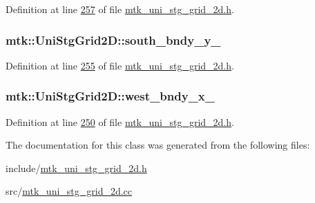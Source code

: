 Definition at line \hyperlink{mtk__uni__stg__grid__2d_8h_source_l00257}{257} of file \hyperlink{mtk__uni__stg__grid__2d_8h_source}{mtk\-\_\-uni\-\_\-stg\-\_\-grid\-\_\-2d.\-h}.

\hypertarget{classmtk_1_1UniStgGrid2D_aa36037d53f3d00433f5eaa0a05b712bc}{
\subsubsection[{south\-\_\-bndy\-\_\-y\-\_\-}]{ mtk\-::\-Uni\-Stg\-Grid2\-D\-::south\-\_\-bndy\-\_\-y\-\_\-\hspace{0.3cm}{\ttfamily [private]}}}\label{classmtk_1_1UniStgGrid2D_aa36037d53f3d00433f5eaa0a05b712bc}


Definition at line \hyperlink{mtk__uni__stg__grid__2d_8h_source_l00255}{255} of file \hyperlink{mtk__uni__stg__grid__2d_8h_source}{mtk\-\_\-uni\-\_\-stg\-\_\-grid\-\_\-2d.\-h}.

\hypertarget{classmtk_1_1UniStgGrid2D_ae2c61a101e6c2c9b69cef2a245512434}{
\subsubsection[{west\-\_\-bndy\-\_\-x\-\_\-}]{ mtk\-::\-Uni\-Stg\-Grid2\-D\-::west\-\_\-bndy\-\_\-x\-\_\-\hspace{0.3cm}{\ttfamily [private]}}}\label{classmtk_1_1UniStgGrid2D_ae2c61a101e6c2c9b69cef2a245512434}


Definition at line \hyperlink{mtk__uni__stg__grid__2d_8h_source_l00250}{250} of file \hyperlink{mtk__uni__stg__grid__2d_8h_source}{mtk\-\_\-uni\-\_\-stg\-\_\-grid\-\_\-2d.\-h}.



The documentation for this class was generated from the following files\-:\begin{DoxyCompactItemize}
\item 
include/\hyperlink{mtk__uni__stg__grid__2d_8h}{mtk\-\_\-uni\-\_\-stg\-\_\-grid\-\_\-2d.\-h}\item 
src/\hyperlink{mtk__uni__stg__grid__2d_8cc}{mtk\-\_\-uni\-\_\-stg\-\_\-grid\-\_\-2d.\-cc}\end{DoxyCompactItemize}
